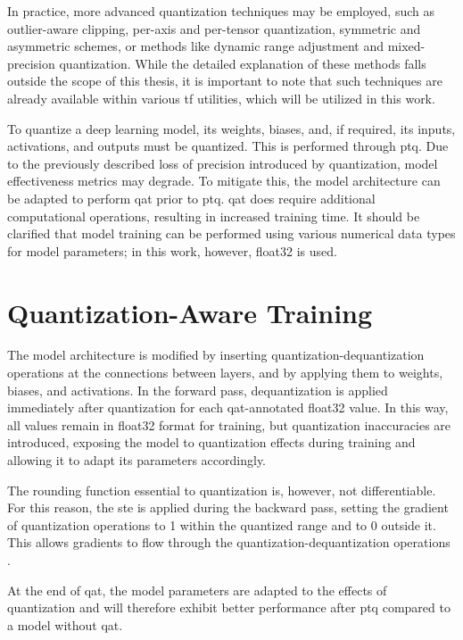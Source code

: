 {In practice, more advanced quantization techniques may be employed, such as outlier-aware clipping, per-axis and per-tensor quantization,
symmetric and asymmetric schemes, or methods like dynamic range adjustment and mixed-precision quantization.
While the detailed explanation of these methods falls outside the scope of this thesis,
it is important to note that such techniques are already available within various \gls{tf} utilities, which will be utilized in this work.

To quantize a deep learning model, its weights, biases, and, if required, its inputs, activations, and outputs must be quantized. This is performed through \gls{ptq}.
Due to the previously described loss of precision introduced by quantization, model effectiveness metrics may degrade.
To mitigate this, the model architecture can be adapted to perform \gls{qat} prior to \gls{ptq}.
\gls{qat} does require additional computational operations, resulting in increased training time.
It should be clarified that model training can be performed using various numerical data types for model parameters; in this work, however, \gls{float32} is used.

\section{Quantization-Aware Training}
\label{subsubsec:qat}

The model architecture is modified by inserting quantization-dequantization operations at the connections between layers,
and by applying them to weights, biases, and activations.
In the forward pass, dequantization is applied immediately after quantization for each \gls{qat}-annotated \gls{float32} value.
In this way, all values remain in \gls{float32} format for training,
but quantization inaccuracies are introduced, exposing the model to quantization effects during training and allowing it to adapt its parameters accordingly.

The rounding function essential to quantization is, however, not differentiable. For this reason, the \gls{ste} is applied during the backward pass,
setting the gradient of quantization operations to 1 within the quantized range and to 0 outside it.
This allows gradients to flow through the quantization-dequantization operations \cite{qatBackwardPass}.

At the end of \gls{qat}, the model parameters are adapted to the effects of quantization and will therefore exhibit better performance after \gls{ptq} compared to a model without \gls{qat}.

}
